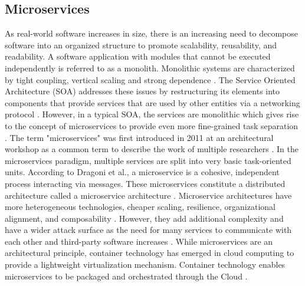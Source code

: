 \subsection{Microservices}
\label{chap:microservices}

As real-world software increases in size, there is an increasing need to decompose software into an organized structure to promote scalability, reusability, and readability. A software application with modules that cannot be executed independently is referred to as a monolith. Monolithic systems  are characterized by tight coupling, vertical scaling and strong dependence \cite{microservicesfrowler}. The Service Oriented Architecture (SOA) addresses these issues by restructuring its elements into components that provide services that are used by other entities via a networking protocol \cite{papazoglou2003service}. However, in a typical SOA, the services are monolithic which gives rise to the concept of microservices  to provide even more fine-grained task separation \cite{ahmadvand2016requirements}. The term "microservices" was first introduced in 2011 at an architectural workshop as a common term to describe the work of multiple researchers \cite{dragoni2017microservices, microservicesfrowler}. In the microservices paradigm, multiple services are split into very basic task-oriented units. According to Dragoni et al., a microservice is a cohesive, independent process interacting via messages. These microservices constitute a distributed architecture called a microservice architecture \cite{dragoni2017microservices}. Microservice architectures have more heterogeneous technologies, cheaper scaling, resilience, organizational alignment, and composability \cite{newman2015building}. However, they add additional complexity and have a wider attack surface as the need for many services to communicate with each other and third-party software increases \cite{combe2016docker, dragoni2017microservices}. While microservices are an architectural principle, container technology has emerged in cloud computing to provide a lightweight virtualization mechanism. Container technology enables microservices to be packaged and orchestrated through the Cloud \cite{pahl2016microservices}.

